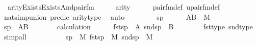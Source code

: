 \begin{isabellebody}
\ {}{\isacharcolon}{\kern0pt}\ {\isachardoublequoteopen}arity{\isacharparenleft}{\kern0pt}Exists{\isacharparenleft}{\kern0pt}Exists{\isacharparenleft}{\kern0pt}And{\isacharparenleft}{\kern0pt}pair{\isacharunderscore}{\kern0pt}fm{\isacharparenleft}{\kern0pt}{}{\isacharcomma}{\kern0pt}{}{\isacharcomma}{\kern0pt}{}{\isacharparenright}{\kern0pt}{\isacharcomma}{\kern0pt}{\isacharquery}{\kern0pt}{\isasymphi}{\isacharprime}{\kern0pt}{\isacharparenright}{\kern0pt}{\isacharparenright}{\kern0pt}{\isacharparenright}{\kern0pt}{\isacharparenright}{\kern0pt}{\isasymle}{}{\isachardoublequoteclose}\ \ \ \ \ {\isacharparenleft}{\kern0pt}\ {\isachardoublequoteopen}arity{\isacharparenleft}{\kern0pt}{\isacharquery}{\kern0pt}{\isasympsi}{\isacharparenright}{\kern0pt}{\isasymle}{}{\isachardoublequoteclose}{\isacharparenright}{\kern0pt}\isanewline
\ \ \ \ \isamarkupfalse%
\ pair{\isacharunderscore}{\kern0pt}fm{\isacharunderscore}{\kern0pt}def\ upair{\isacharunderscore}{\kern0pt}fm{\isacharunderscore}{\kern0pt}def\isanewline
\ \ \ \ \isamarkupfalse%
\ nat{\isacharunderscore}{\kern0pt}simp{\isacharunderscore}{\kern0pt}union\ pred{\isacharunderscore}{\kern0pt}le\ arity{\isacharunderscore}{\kern0pt}type\ \isamarkupfalse%
\ auto\isanewline
\ \ \isacommand{{\isacharbraceleft}{\kern0pt}}\isamarkupfalse%
\isanewline
\ \ \ \ \isamarkupfalse%
\ sp\isanewline
\ \ \ \ \isamarkupfalse%
\ {\isacartoucheopen}A{\isasymtimes}B\ {\isasymin}\ M{\isacartoucheclose}\isanewline
\ \ \ \ \isamarkupfalse%
\isanewline
\ \ \ \ \isamarkupfalse%
\ {\isachardoublequoteopen}sp\ {\isasymin}\ A{\isasymtimes}B{\isachardoublequoteclose}\isanewline
\ \ \ \ \isamarkupfalse%
\ \isamarkupfalse%
\ calculation\isanewline
\ \ \ \ \isamarkupfalse%
\ {\isachardoublequoteopen}fst{\isacharparenleft}{\kern0pt}sp{\isacharparenright}{\kern0pt}\ {\isasymin}\ A{\isachardoublequoteclose}\ {\isachardoublequoteopen}snd{\isacharparenleft}{\kern0pt}sp{\isacharparenright}{\kern0pt}\ {\isasymin}\ B{\isachardoublequoteclose}\isanewline
\ \ \ \ \ \ \isamarkupfalse%
\ fst{\isacharunderscore}{\kern0pt}type\ snd{\isacharunderscore}{\kern0pt}type\ \isamarkupfalse%
\ simp{\isacharunderscore}{\kern0pt}all\isanewline
\ \ \ \ \isamarkupfalse%
\isanewline
\ \ \ \ \isamarkupfalse%
\ {\isachardoublequoteopen}sp\ {\isasymin}\ M{\isachardoublequoteclose}\ {\isachardoublequoteopen}fst{\isacharparenleft}{\kern0pt}sp{\isacharparenright}{\kern0pt}\ {\isasymin}\ M{\isachardoublequoteclose}\ {\isachardoublequoteopen}snd{\isacharparenleft}{\kern0pt}sp{\isacharparenright}{\kern0pt}\ {\isasymin}\ M{\isachardoublequoteclose}\isanewline

\end{isabellebody}
